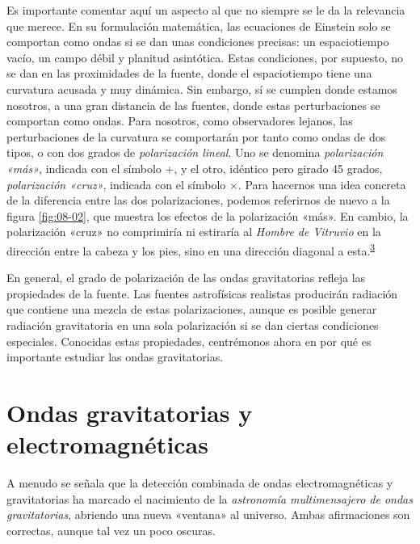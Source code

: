 Es importante comentar aquí un aspecto al que no siempre se le da la relevancia que merece. En su formulación matemática, las ecuaciones de Einstein solo se comportan como ondas si se dan unas condiciones precisas: un espaciotiempo vacío, un campo débil y planitud asintótica. Estas condiciones, por supuesto, no se dan en las proximidades de la fuente, donde el espaciotiempo tiene una curvatura acusada y muy dinámica. Sin embargo, sí se cumplen donde estamos nosotros, a una gran distancia de las fuentes, donde estas perturbaciones se comportan como ondas. Para nosotros, como observadores lejanos, las perturbaciones de la curvatura se comportarán por tanto como ondas de dos tipos, o con dos grados de \emph{polarización lineal}. Uno se denomina \emph{polarización «más»}, indicada con el símbolo +, y el otro, idéntico pero girado 45 grados, \emph{polarización «cruz»}, indicada con el símbolo ×. Para hacernos una idea concreta de la diferencia entre las dos polarizaciones, podemos referirnos de nuevo a la figura \ref{fig:08-02}, que muestra los efectos de la polarización «más». En cambio, la polarización «cruz» no comprimiría ni estiraría al \emph{Hombre de Vitruvio} en la dirección entre la cabeza y los pies, sino en una dirección diagonal a esta.\textsuperscript{\hyperlink{note:08-03}{3}}

En general, el grado de polarización de las ondas gravitatorias refleja las propiedades de la fuente. Las fuentes astrofísicas realistas producirán radiación que contiene una mezcla de estas polarizaciones, aunque es posible generar radiación gravitatoria en una sola polarización si se dan ciertas condiciones especiales. Conocidas estas propiedades, centrémonos ahora en por qué es importante estudiar las ondas gravitatorias.

\section{Ondas gravitatorias y electromagnéticas}\label{sec:08-comparison}

A menudo se señala que la detección combinada de ondas electromagnéticas y gravitatorias ha marcado el nacimiento de la \emph{astronomía multimensajero de ondas gravitatorias}, abriendo una nueva «ventana» al universo. Ambas afirmaciones son correctas, aunque tal vez un poco oscuras.

